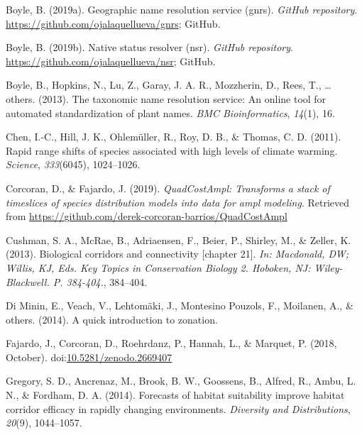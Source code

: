 \documentclass[]{article}
\begin{document}
\leavevmode\hypertarget{ref-Boyle2019GNRS}{}%
Boyle, B. (2019a). Geographic name resolution service (gnrs). \emph{GitHub repository}. \url{https://github.com/ojalaquellueva/gnrs}; GitHub.

\leavevmode\hypertarget{ref-Boyle2019NSR}{}%
Boyle, B. (2019b). Native status resolver (nsr). \emph{GitHub repository}. \url{https://github.com/ojalaquellueva/nsr}; GitHub.

\leavevmode\hypertarget{ref-boyle2013taxonomic}{}%
Boyle, B., Hopkins, N., Lu, Z., Garay, J. A. R., Mozzherin, D., Rees, T., \ldots{} others. (2013). The taxonomic name resolution service: An online tool for automated standardization of plant names. \emph{BMC Bioinformatics}, \emph{14}(1), 16.

\leavevmode\hypertarget{ref-chen2011rapid}{}%
Chen, I.-C., Hill, J. K., Ohlemüller, R., Roy, D. B., \& Thomas, C. D. (2011). Rapid range shifts of species associated with high levels of climate warming. \emph{Science}, \emph{333}(6045), 1024--1026.

\leavevmode\hypertarget{ref-Corcoran_Quadcost}{}%
Corcoran, D., \& Fajardo, J. (2019). \emph{QuadCostAmpl: Transforms a stack of timeslices of species distribution models into data for ampl modeling}. Retrieved from \url{https://github.com/derek-corcoran-barrios/QuadCostAmpl}

\leavevmode\hypertarget{ref-cushman2013biological}{}%
Cushman, S. A., McRae, B., Adriaensen, F., Beier, P., Shirley, M., \& Zeller, K. (2013). Biological corridors and connectivity {[}chapter 21{]}. \emph{In: Macdonald, DW; Willis, KJ, Eds. Key Topics in Conservation Biology 2. Hoboken, NJ: Wiley-Blackwell. P. 384-404.}, 384--404.

\leavevmode\hypertarget{ref-di2014quick}{}%
Di Minin, E., Veach, V., Lehtomäki, J., Montesino Pouzols, F., Moilanen, A., \& others. (2014). A quick introduction to zonation.

\leavevmode\hypertarget{ref-fajardo_javier_2018_2669407}{}%
Fajardo, J., Corcoran, D., Roehrdanz, P., Hannah, L., \& Marquet, P. (2018, October). doi:\href{https://doi.org/10.5281/zenodo.2669407}{10.5281/zenodo.2669407}

\leavevmode\hypertarget{ref-gregory2014forecasts}{}%
Gregory, S. D., Ancrenaz, M., Brook, B. W., Goossens, B., Alfred, R., Ambu, L. N., \& Fordham, D. A. (2014). Forecasts of habitat suitability improve habitat corridor efficacy in rapidly changing environments. \emph{Diversity and Distributions}, \emph{20}(9), 1044--1057.
\end{document}
